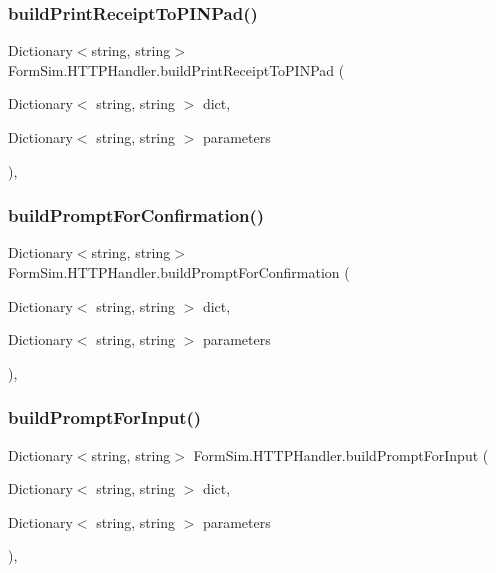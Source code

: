 \subsubsection{\texorpdfstring{build\+Print\+Receipt\+To\+P\+I\+N\+Pad()}{buildPrintReceiptToPINPad()}}
{\footnotesize\ttfamily Dictionary$<$string, string$>$ Form\+Sim.\+H\+T\+T\+P\+Handler.\+build\+Print\+Receipt\+To\+P\+I\+N\+Pad (\begin{DoxyParamCaption}\item[{Dictionary$<$ string, string $>$}]{dict,  }\item[{Dictionary$<$ string, string $>$}]{parameters }\end{DoxyParamCaption})\hspace{0.3cm}{\ttfamily [inline]}, {\ttfamily [private]}}

\mbox{\label{class_form_sim_1_1_h_t_t_p_handler_a4789d729c73cbc504c637df203773492}} 
\subsubsection{\texorpdfstring{build\+Prompt\+For\+Confirmation()}{buildPromptForConfirmation()}}
{\footnotesize\ttfamily Dictionary$<$string, string$>$ Form\+Sim.\+H\+T\+T\+P\+Handler.\+build\+Prompt\+For\+Confirmation (\begin{DoxyParamCaption}\item[{Dictionary$<$ string, string $>$}]{dict,  }\item[{Dictionary$<$ string, string $>$}]{parameters }\end{DoxyParamCaption})\hspace{0.3cm}{\ttfamily [inline]}, {\ttfamily [private]}}

\mbox{\label{class_form_sim_1_1_h_t_t_p_handler_ab744b8ed04ff82ee322455a18010088e}} 
\subsubsection{\texorpdfstring{build\+Prompt\+For\+Input()}{buildPromptForInput()}}
{\footnotesize\ttfamily Dictionary$<$string, string$>$ Form\+Sim.\+H\+T\+T\+P\+Handler.\+build\+Prompt\+For\+Input (\begin{DoxyParamCaption}\item[{Dictionary$<$ string, string $>$}]{dict,  }\item[{Dictionary$<$ string, string $>$}]{parameters }\end{DoxyParamCaption})\hspace{0.3cm}{\ttfamily [inline]}, {\ttfamily [private]}}

